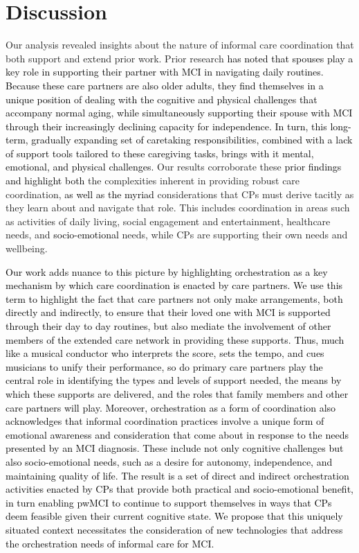 \documentclass[acmsmall]{acmart}
\begin{document}
\section{Discussion}
Our analysis revealed insights about the nature of informal care coordination that both support and extend prior work. Prior research \textcolor{black}{has noted that spouses play a key role in supporting their partner with MCI in navigating daily routines. Because these care partners are also older adults, they find themselves in a unique position of dealing with the cognitive and physical challenges that accompany normal aging, while simultaneously supporting their spouse with MCI through their increasingly declining capacity for independence. In turn, this long-term, gradually expanding set of caretaking responsibilities, combined with a lack of support tools tailored to these caregiving tasks, brings with it mental, emotional, and physical challenges.} Our results corroborate these \textcolor{black}{prior findings and highlight both} the complexities inherent in providing robust care coordination, \textcolor{black}{as well as the myriad} considerations that CPs must derive tacitly as they learn about and navigate that role. This includes coordination in areas such as activities of daily living, social engagement and entertainment, healthcare needs, and \textcolor{black}{socio-emotional} needs, while CPs are supporting their own needs and wellbeing.

\textcolor{black}{Our work adds nuance to this picture by highlighting orchestration as a key mechanism by which care coordination is enacted by care partners.  We use this term to highlight the fact that care partners not only make arrangements, both directly and indirectly, to ensure that their loved one with MCI is supported through their day to day routines, but also mediate the involvement of other members of the extended care network in providing these supports. Thus, much like a musical conductor who interprets the score, sets the tempo, and cues musicians to unify their performance, so do primary care partners play the central role in identifying the types and levels of support needed, the means by which these supports are delivered, and the roles that family members and other care partners will play. Moreover, orchestration as a form of coordination also acknowledges that informal coordination practices involve a unique form of emotional awareness and consideration that come about in response to the needs presented by an MCI diagnosis. These include not only cognitive challenges but also socio-emotional needs, such as a desire for autonomy, independence, and maintaining quality of life. The result is a set of direct and indirect orchestration activities enacted by CPs that provide both practical  and socio\textcolor{black}{-}emotional benefit, in turn enabling pwMCI to continue to support themselves in ways that CPs deem feasible given their current cognitive state. We propose that this uniquely situated context necessitates the consideration of new technologies that address the orchestration needs of informal care for MCI.}
\end{document}
